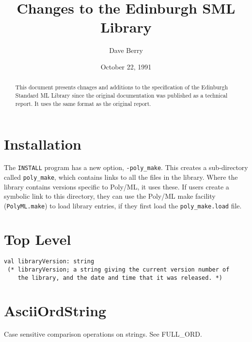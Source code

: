 %
%
%
%


\title{Changes to the Edinburgh SML Library}
\author{Dave Berry}
\date{October 22, 1991}



\maketitle

\begin{abstract}
This document presents chnages and additions to the specification
of the Edinburgh Standard ML Library since the original documentation
was published as a technical report.  It uses the same format as
the original report.
\end{abstract}

\tableofcontents

\newpage
\section{Installation}

The {\tt INSTALL} program has a new option, {\tt -poly\_make}.
This creates a sub-directory called {\tt poly\_make}, which
contains links to all the files in the library.  Where the
library contains versions specific to Poly/ML, it uses these.
If users create a symbolic link to this directory, they can use
the Poly/ML make facility ({\tt PolyML.make}) to load library
entries, if they first load the {\tt poly\_make.load} file.


\section{Top Level}
\begin{verbatim}
val libraryVersion: string
 (* libraryVersion; a string giving the current version number of
    the library, and the date and time that it was released. *)
\end{verbatim}

\section{AsciiOrdString}
Case sensitive comparison operations on strings. See FULL\_ORD.

